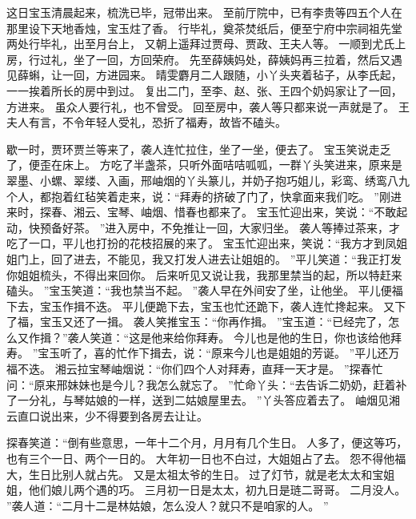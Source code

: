 这日宝玉清晨起来，梳洗已毕，冠带出来。
至前厅院中，已有李贵等四五个人在那里设下天地香烛，宝玉炷了香。
行毕礼，奠茶焚纸后，便至宁府中宗祠祖先堂两处行毕礼，出至月台上，
又朝上遥拜过贾母、贾政、王夫人等。
一顺到尤氏上房，行过礼，坐了一回，方回荣府。
先至薛姨妈处，薛姨妈再三拉着，然后又遇见薛蝌，让一回，方进园来。
晴雯麝月二人跟随，小丫头夹着毡子，从李氏起，一一挨着所长的房中到过。
复出二门，至李、赵、张、王四个奶妈家让了一回，方进来。
虽众人要行礼，也不曾受。
回至房中，袭人等只都来说一声就是了。
王夫人有言，不令年轻人受礼，恐折了福寿，故皆不磕头。
\par
歇一时，贾环贾兰等来了，袭人连忙拉住，坐了一坐，便去了。
宝玉笑说走乏了，便歪在床上。
方吃了半盏茶，只听外面咭咭呱呱，一群丫头笑进来，原来是翠墨、小螺、翠缕、入画，邢岫烟的丫头篆儿，并奶子抱巧姐儿，彩鸾、绣鸾八九个人，都抱着红毡笑着走来，说：“拜寿的挤破了门了，快拿面来我们吃。
”刚进来时，探春、湘云、宝琴、岫烟、惜春也都来了。
宝玉忙迎出来，笑说：“不敢起动，快预备好茶。
”进入房中，不免推让一回，大家归坐。
袭人等捧过茶来，才吃了一口，平儿也打扮的花枝招展的来了。
宝玉忙迎出来，笑说：“我方才到凤姐姐门上，回了进去，不能见，我又打发人进去让姐姐的。
”平儿笑道：“我正打发你姐姐梳头，不得出来回你。
后来听见又说让我，我那里禁当的起，所以特赶来磕头。
”宝玉笑道：“我也禁当不起。
”袭人早在外间安了坐，让他坐。
平儿便福下去，宝玉作揖不迭。
平儿便跪下去，宝玉也忙还跪下，袭人连忙搀起来。
又下了福，宝玉又还了一揖。
袭人笑推宝玉：“你再作揖。
”宝玉道：“已经完了，怎么又作揖？”袭人笑道：“这是他来给你拜寿。
今儿也是他的生日，你也该给他拜寿。
”宝玉听了，喜的忙作下揖去，说：“原来今儿也是姐姐的芳诞。
”平儿还万福不迭。
湘云拉宝琴岫烟说：“你们四个人对拜寿，直拜一天才是。
”探春忙问：“原来邢妹妹也是今儿？我怎么就忘了。
”忙命丫头：“去告诉二奶奶，赶着补了一分礼，与琴姑娘的一样，送到二姑娘屋里去。
”丫头答应着去了。
岫烟见湘云直口说出来，少不得要到各房去让让。
\par
探春笑道：“倒有些意思，一年十二个月，月月有几个生日。
人多了，便这等巧，也有三个一日、两个一日的。
大年初一日也不白过，大姐姐占了去。
怨不得他福大，生日比别人就占先。
又是太祖太爷的生日。
过了灯节，就是老太太和宝姐姐，他们娘儿两个遇的巧。
三月初一日是太太，初九日是琏二哥哥。
二月没人。
”袭人道：“二月十二是林姑娘，怎么没人？就只不是咱家的人。
”
